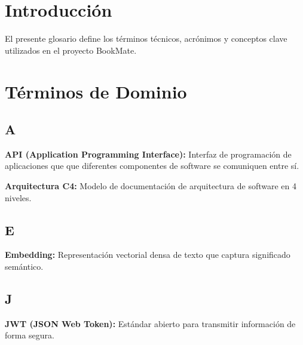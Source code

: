 
\def\docTitle{Glosario de Términos Técnicos}
\def\docSubtitle{Proyecto BookMate}
\def\docWeek{7}
\def\docVersion{1.0}





\makeUNIcover
\tableofcontents
\newpage

\section{Introducción}

El presente glosario define los términos técnicos, acrónimos y conceptos clave utilizados en el proyecto BookMate.

\section{Términos de Dominio}

\subsection{A}

\textbf{API (Application Programming Interface):}
Interfaz de programación de aplicaciones que  que diferentes componentes de software se comuniquen entre sí.

\textbf{Arquitectura C4:}
Modelo de documentación de arquitectura de software en 4 niveles.

\subsection{E}

\textbf{Embedding:}
Representación vectorial densa de texto que captura significado semántico.

\subsection{J}

\textbf{JWT (JSON Web Token):}
Estándar abierto para transmitir información de forma segura.

\printbibliography[heading=bibintoc,title={Referencias}]


